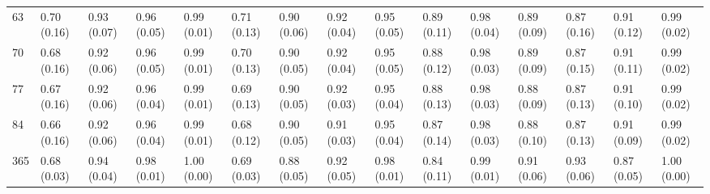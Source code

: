 \begin{tabular}{lllllllllllllll}
63  &  0.70 (0.16) &  0.93 (0.07) &    0.96 (0.05) &  0.99 (0.01) &       0.71 (0.13) &  0.90 (0.06) &     0.92 (0.04) &        0.95 (0.05) &    0.89 (0.11) &  0.98 (0.04) &     0.89 (0.09) &      0.87 (0.16) &  0.91 (0.12) &  0.99 (0.02) \\
70  &  0.68 (0.16) &  0.92 (0.06) &    0.96 (0.05) &  0.99 (0.01) &       0.70 (0.13) &  0.90 (0.05) &     0.92 (0.04) &        0.95 (0.05) &    0.88 (0.12) &  0.98 (0.03) &     0.89 (0.09) &      0.87 (0.15) &  0.91 (0.11) &  0.99 (0.02) \\
77  &  0.67 (0.16) &  0.92 (0.06) &    0.96 (0.04) &  0.99 (0.01) &       0.69 (0.13) &  0.90 (0.05) &     0.92 (0.03) &        0.95 (0.04) &    0.88 (0.13) &  0.98 (0.03) &     0.88 (0.09) &      0.87 (0.13) &  0.91 (0.10) &  0.99 (0.02) \\
84  &  0.66 (0.16) &  0.92 (0.06) &    0.96 (0.04) &  0.99 (0.01) &       0.68 (0.12) &  0.90 (0.05) &     0.91 (0.03) &        0.95 (0.04) &    0.87 (0.14) &  0.98 (0.03) &     0.88 (0.10) &      0.87 (0.13) &  0.91 (0.09) &  0.99 (0.02) \\
365 &  0.68 (0.03) &  0.94 (0.04) &    0.98 (0.01) &  1.00 (0.00) &       0.69 (0.03) &  0.88 (0.05) &     0.92 (0.05) &        0.98 (0.01) &    0.84 (0.11) &  0.99 (0.01) &     0.91 (0.06) &      0.93 (0.06) &  0.87 (0.05) &  1.00 (0.00) \\
\bottomrule
\end{tabular}
